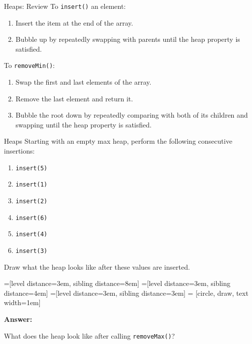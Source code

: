 \documentclass[9pt]{beamer}
\begin{document}
\begin{frame}[fragile]{Heaps: Review}
  To {\tt insert()} an element:
  \begin{enumerate}
    \item
      Insert the item at the end of the array.
    \item
      Bubble up by repeatedly swapping with parents until the heap property
      is satisfied.
  \end{enumerate}

  \vspace{2em}

  \pause
  To {\tt removeMin()}:
  \begin{enumerate}
    \item
      Swap the first and last elements of the array.
    \item
      Remove the last element and return it.
    \item
      Bubble the root down by repeatedly comparing with both of its children
      and swapping until the heap property is satisfied.
  \end{enumerate}
\end{frame}

\begin{frame}[fragile]{Heaps}
  Starting with an empty max heap, perform the following consecutive
  insertions:
  \begin{enumerate}
    \item
      {\tt insert(5)}
    \item
      {\tt insert(1)}
    \item
      {\tt insert(2)}
    \item
      {\tt insert(6)}
    \item
      {\tt insert(4)}
    \item
      {\tt insert(3)}
  \end{enumerate}

  Draw what the heap looks like after these values are inserted.

  =[level distance=3em, sibling distance=8em]
  =[level distance=3em, sibling distance=4em]
  =[level distance=3em, sibling distance=3em]
   = [circle, draw, text width=1em]

  \pause
  {\bf Answer:}


  \pause
  What does the heap look like after calling {\tt removeMax()}?
\end{frame}
\end{document}
